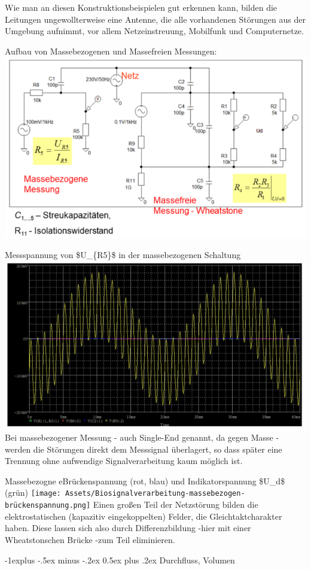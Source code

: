 \documentclass[a4paper]{article}
\makeatletter
\renewcommand{\subsection}{\@startsection{subsection}{2}{0mm}%
 {-1explus -.5ex minus -.2ex}%
 {0.5ex plus .2ex}%
 {\normalfont\normalsize\bfseries}}
\makeatother
\begin{document}
\begin{multicols}{3}
  Wie man an diesen Konstruktionsbeispielen gut erkennen kann, bilden die
  Leitungen ungewollterweise eine Antenne, die alle vorhandenen Störungen
  aus der Umgebung aufnimmt, vor allem Netzeinstreuung, Mobilfunk und
  Computernetze.

  Aufbau von Massebezogenen und Massefreien Messungen:
  \includegraphics[width=.5\linewidth]{Assets/Biosignalverarbeitung-masse-messung.png}

  Messspannung von \$U\_\{R5\}\$ in der massebezogenen Schaltung
  \includegraphics[width=.5\linewidth]{Assets/Biosignalverarbeitung-messspannung-massebezogen.png}
  Bei massebezogener Messung - auch Single-End genannt, da gegen Masse -
  werden die Störungen direkt dem Messsignal überlagert, so dass später
  eine Trennung ohne aufwendige Signalverarbeitung kaum möglich ist.

  Massebezogne eBrückenspannung (rot, blau) und Indikatorspannung \$U\_d\$
  (grün)
  \texttt{[image: Assets/Biosignalverarbeitung-massebezogen-brückenspannung.png]}
  Einen großen Teil der Netzstörung bilden die elektrostatischen
  (kapazitiv eingekoppelten) Felder, die Gleichtaktcharakter haben. Diese
  lassen sich also durch Differenzbildung -hier mit einer Wheatstonschen
  Brücke -zum Teil eliminieren.

  \subsection{Durchfluss, Volumen}\label{durchfluss-volumen}


\end{multicols}
\end{document}
